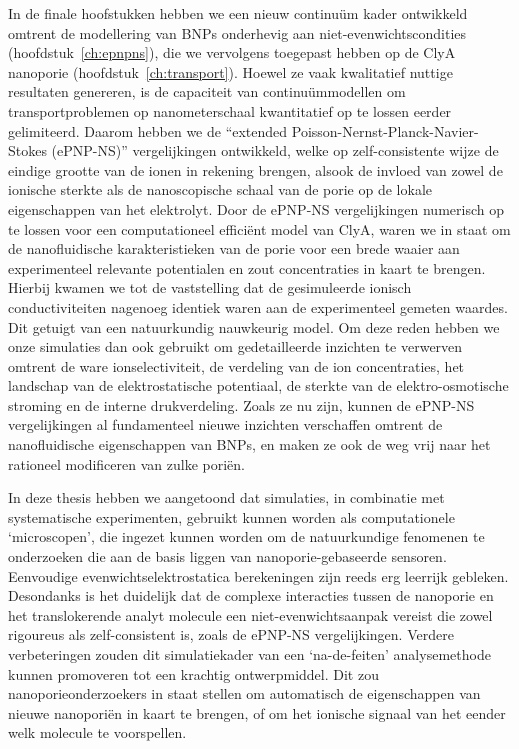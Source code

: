 In de finale hoofstukken hebben we een nieuw continu\"{u}m kader ontwikkeld omtrent de modellering van BNPs
onderhevig aan niet-evenwichtscondities (hoofdstuk~\ref{ch:epnpns}), die we vervolgens toegepast hebben op de
ClyA nanoporie (hoofdstuk~\ref{ch:transport}). Hoewel ze vaak kwalitatief nuttige resultaten genereren, is
de capaciteit van continu\"{u}mmodellen om transportproblemen op nanometerschaal kwantitatief op te lossen
eerder gelimiteerd. Daarom hebben we de ``extended Poisson-Nernst-Planck-Navier-Stokes ({ePNP-NS})''
vergelijkingen ontwikkeld, welke op zelf-consistente wijze de eindige grootte van de ionen in rekening
brengen, alsook de invloed van zowel de ionische sterkte als de nanoscopische schaal van de porie op de lokale
eigenschappen van het elektrolyt. Door de {ePNP-NS} vergelijkingen numerisch op te lossen voor een
computationeel effici\"{e}nt model van ClyA, waren we in staat om de nanofluidische karakteristieken van de
porie voor een brede waaier aan experimenteel relevante potentialen en zout concentraties in kaart te brengen.
Hierbij kwamen we tot de vaststelling dat de gesimuleerde ionisch conductiviteiten nagenoeg identiek waren aan
de experimenteel gemeten waardes. Dit getuigt van een natuurkundig nauwkeurig model. Om deze reden hebben we
onze simulaties dan ook gebruikt om gedetailleerde inzichten te verwerven omtrent de ware ionselectiviteit, de
verdeling van de ion concentraties, het landschap van de elektrostatische potentiaal, de sterkte van de
elektro-osmotische stroming en de interne drukverdeling. Zoals ze nu zijn, kunnen de {ePNP-NS} vergelijkingen
al fundamenteel nieuwe inzichten verschaffen omtrent de nanofluidische eigenschappen van BNPs, en maken ze ook
de weg vrij naar het rationeel modificeren van zulke pori\"{e}n.

In deze thesis hebben we aangetoond dat simulaties, in combinatie met systematische experimenten, gebruikt
kunnen worden als computationele `microscopen', die ingezet kunnen worden om de natuurkundige fenomenen te
onderzoeken die aan de basis liggen van nanoporie-gebaseerde sensoren. Eenvoudige evenwichtselektrostatica
berekeningen zijn reeds erg leerrijk gebleken. Desondanks is het duidelijk dat de complexe interacties tussen
de nanoporie en het translokerende analyt molecule een niet-evenwichtsaanpak vereist die zowel rigoureus als
zelf-consistent is, zoals de {ePNP-NS} vergelijkingen. Verdere verbeteringen zouden dit simulatiekader van een
`na-de-feiten' analysemethode kunnen promoveren tot een krachtig ontwerpmiddel. Dit zou nanoporieonderzoekers
in staat stellen om automatisch de eigenschappen van nieuwe nanopori\"{e}n in kaart te brengen, of om het
ionische signaal van het eender welk molecule te voorspellen.


\cleardoublepage

